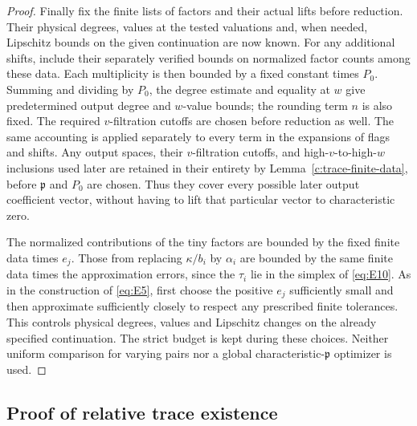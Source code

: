 \begin{proof}
Finally fix the finite lists of factors and their actual lifts before
reduction.  Their physical degrees, values at the tested valuations and,
when needed, Lipschitz bounds on the given continuation are now known.
For any additional shifts, include their separately verified bounds on
normalized factor counts among these data.  Each multiplicity is then
bounded by a fixed constant times $P_0$.  Summing and dividing by $P_0$,
the degree estimate and equality at $w$ give predetermined output degree
and $w$-value bounds; the rounding term $n$ is also fixed.  The required
$v$-filtration cutoffs are chosen before reduction as well.  The same
accounting is applied separately to every term in
the expansions of flags and shifts.  Any output spaces, their
$v$-filtration cutoffs, and high-$v$-to-high-$w$ inclusions used later
are retained in their entirety by Lemma~\ref{c:trace-finite-data}, before
$\mathfrak p$ and $P_0$ are chosen.  Thus they cover every possible later output
coefficient vector, without having to lift that particular vector to
characteristic zero.

The normalized contributions of the tiny factors are bounded by the
fixed finite data times $e_j$.  Those from replacing $\kappa/b_i$ by
$\alpha_i$ are bounded by the same finite data times the approximation
errors, since the $\tau_i$ lie in the simplex of \eqref{eq:E10}.
As in the construction of \eqref{eq:E5}, first choose the positive
$e_j$ sufficiently small and then approximate sufficiently closely to
respect any prescribed finite tolerances.  This controls physical degrees,
values and Lipschitz changes on the already specified continuation.
The strict budget is kept during these choices.  Neither uniform
comparison for varying pairs nor a global characteristic-$\mathfrak p$ optimizer
is used.
\end{proof}

\subsection{Proof of relative trace existence}

